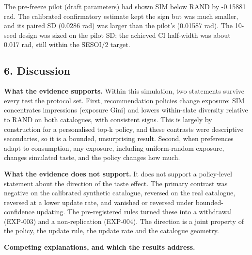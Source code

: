 \documentclass[
]{article}
\begin{document}
The pre-freeze pilot (draft parameters) had shown SIM below RAND by
-0.15881 rad. The calibrated confirmatory estimate kept the sign but was
much smaller, and its paired SD (0.0286 rad) was larger than the pilot's
(0.01587 rad). The 10-seed design was sized on the pilot SD; the
achieved CI half-width was about 0.017 rad, still within the SESOI/2
target.

\subsection{6. Discussion}\label{discussion}

\textbf{What the evidence supports.} Within this simulation, two
statements survive every test the protocol set. First, recommendation
policies change exposure: SIM concentrates impressions (exposure Gini)
and lowers within-slate diversity relative to RAND on both catalogues,
with consistent signs. This is largely by construction for a
personalised top-k policy, and these contrasts were descriptive
secondaries, so it is a bounded, unsurprising result. Second, when
preferences adapt to consumption, any exposure, including uniform-random
exposure, changes simulated taste, and the policy changes how much.

\textbf{What the evidence does not support.} It does not support a
policy-level statement about the direction of the taste effect. The
primary contrast was negative on the calibrated synthetic catalogue,
reversed on the real catalogue, reversed at a lower update rate, and
vanished or reversed under bounded-confidence updating. The
pre-registered rules turned these into a withdrawal (EXP-003) and a
non-replication (EXP-004). The direction is a joint property of the
policy, the update rule, the update rate and the catalogue geometry.

\textbf{Competing explanations, and which the results address.}
\end{document}
